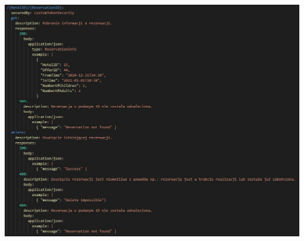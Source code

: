 \documentclass{article}
\begin{document}
\includegraphics[width=\linewidth]{Rezerwacje/reservationEndpoint.jpg}
\end{document}
